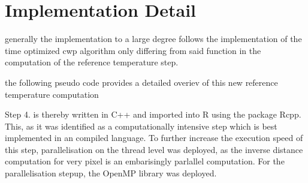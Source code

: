 

\section{Implementation Detail}

generally the implementation to a large degree follows the implementation of the time optimized cwp algorithm only differing from said function in the computation of the reference temperature step.

the following pseudo code provides a detailed overiev of this new reference temperature computation


 Step 4. is thereby written in C++ and imported into R using the package Rcpp. This, as it was identified as a computationally intensive step which is best implemented in an compiled language. To further increase the execution speed of this step, parallelisation on the thread level was deployed, as the inverse distance computation for very pixel is an embarisingly parlallel computation. For the parallelisation stepup, the OpenMP library was deployed.



